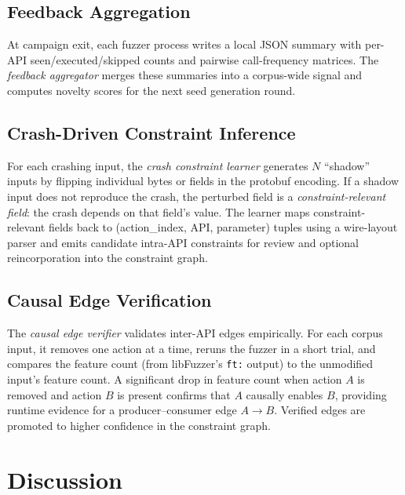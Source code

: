 \documentclass[sigconf,anonymous]{acmart}
\begin{document}
\subsection{Feedback Aggregation}

At campaign exit, each fuzzer process writes a local JSON summary with
per-API seen/executed/skipped counts and pairwise call-frequency
matrices.  The \emph{feedback aggregator} merges these summaries into a
corpus-wide signal and computes novelty scores for the next seed
generation round.

\subsection{Crash-Driven Constraint Inference}

For each crashing input, the \emph{crash constraint learner} generates
$N$ ``shadow'' inputs by flipping individual bytes or fields in the
protobuf encoding.  If a shadow input does not reproduce the crash, the
perturbed field is a \emph{constraint-relevant field}: the crash depends
on that field's value.  The learner maps constraint-relevant fields back
to (action\_index, API, parameter) tuples using a wire-layout parser and
emits candidate intra-API constraints for review and optional
reincorporation into the constraint graph.

\subsection{Causal Edge Verification}

The \emph{causal edge verifier} validates inter-API edges empirically.
For each corpus input, it removes one action at a time, reruns the fuzzer
in a short trial, and compares the feature count (from libFuzzer's
\texttt{ft:} output) to the unmodified input's feature count.  A
significant drop in feature count when action $A$ is removed and action
$B$ is present confirms that $A$ causally enables $B$, providing runtime
evidence for a producer--consumer edge $A \to B$.  Verified edges are
promoted to higher confidence in the constraint graph.



\section{Discussion}
\label{sec:discussion}
\end{document}
